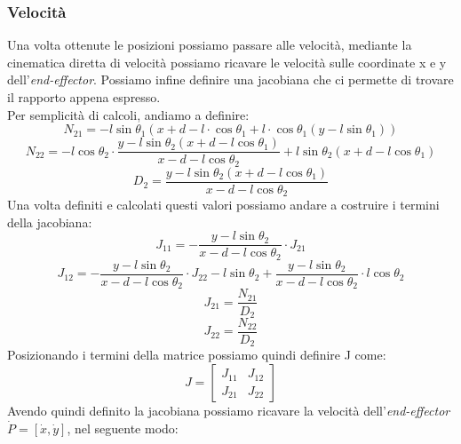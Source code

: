 \subsubsection{Velocità}\label{sec:CalcoloVelCin}
Una volta ottenute le posizioni possiamo passare alle velocità, mediante la cinematica diretta di velocità possiamo ricavare le velocità sulle coordinate x e y dell'\textit{end-effector}. Possiamo infine definire una jacobiana che ci permette di trovare il rapporto appena espresso.
\\Per semplicità di calcoli, andiamo a definire:
\begin{equation*}
    N_{21} = -l\sin\theta_1 (x+d-l\cdot \cos\theta_1 + l\cdot \cos\theta_1 (y-l\sin\theta_1))
\end{equation*}
\begin{equation*}
    N_{22} = -l\cos\theta_2\cdot \frac{y-l\sin\theta_2 (x+d-l\cos\theta_1)}{x-d-l \cos\theta_2} +l\sin\theta_2(x+d-l\cos\theta_1)
\end{equation*}
\begin{equation*}
 D_2 = \frac{y-l\sin\theta_2 (x+d-l\cos\theta_1)}{x-d-l\cos\theta_2}
\end{equation*}
Una volta definiti e calcolati questi valori possiamo andare a costruire i termini della jacobiana:  
\begin{equation*}
    J_{11} = -\frac{y-l\sin\theta_2}{x-d-l\cos\theta_2}\cdot J_{21}
\end{equation*}
\begin{equation*}
    J_{12} = -\frac{y-l\sin\theta_2}{x-d-l\cos\theta_2}\cdot J_{22} - l\sin\theta_2 + \frac{y-l\sin\theta_2}{x-d-l\cos\theta_2}\cdot l\cos\theta_2
\end{equation*}
\begin{equation*}
    J_{21} = \frac{N_{21}}{D_2}
\end{equation*}
\begin{equation*}
    J_{22} = \frac{N_{22}}{D_2}
\end{equation*}
Posizionando i termini della matrice possiamo quindi definire J come:
\begin{equation}
    J = \begin{bmatrix}
    J_{11} & J_{12} \\ J_{21} & J_{22}
    \end{bmatrix}
    \label{eq:J12}
\end{equation}
Avendo quindi definito la jacobiana possiamo ricavare la velocità dell'\textit{end-effector}  $\dot{P} = [\dot{x},\dot{y}]$, nel seguente modo:
